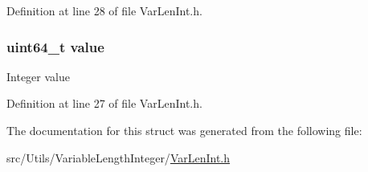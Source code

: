 Definition at line 28 of file VarLenInt.h.

\hypertarget{struct_var_len_int_a4e630859cc0e2a22bd6acf39a6a8e218}{
\subsubsection[{value}]{\setlength{\rightskip}{0pt plus 5cm}uint64\_\-t {\bf value}}}
\label{struct_var_len_int_a4e630859cc0e2a22bd6acf39a6a8e218}
Integer value 

Definition at line 27 of file VarLenInt.h.



The documentation for this struct was generated from the following file:\begin{DoxyCompactItemize}
\item 
src/Utils/VariableLengthInteger/\hyperlink{_var_len_int_8h}{VarLenInt.h}\end{DoxyCompactItemize}
